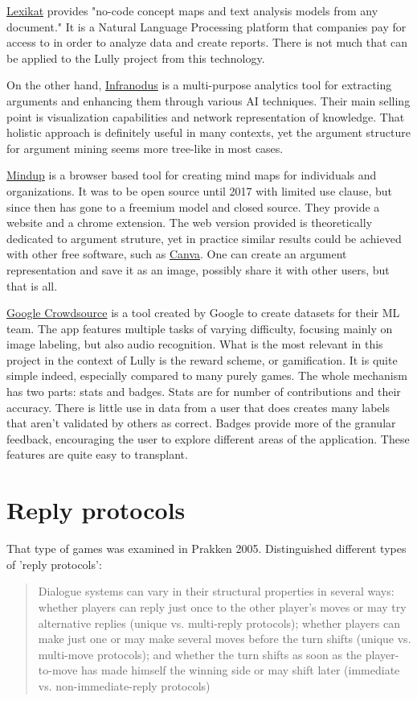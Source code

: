 \documentclass{article}
\begin{document}
\href{https://lexikat.com/#/}{Lexikat} provides "no-code concept maps and text analysis models from any document." It is a Natural Language Processing platform that companies pay for access to in order to analyze data and create reports. There is not much that can be applied to the Lully project from this technology.

On the other hand, \href{https://infranodus.com/}{Infranodus} is a multi-purpose analytics tool for extracting arguments and enhancing them through various AI techniques. Their main selling point is visualization capabilities and network representation of knowledge. That holistic approach is definitely useful in many contexts, yet the argument structure for argument mining seems more tree-like in most cases.

\href{https://www.mindmup.com/}{Mindup} is a browser based tool for creating mind maps for individuals and organizations. It was to be open source until 2017 with limited use clause, but since then has gone to a freemium model and closed source. They provide a website and a chrome extension. The web version provided is theoretically dedicated to argument struture, yet in practice similar results could be achieved with other free software, such as \href{https://www.canva.com/}{Canva}. One can create an argument representation and save it as an image, possibly share it with other users, but that is all.

\href{https://en.wikipedia.org/wiki/Crowdsource_(app)}{Google Crowdsource} is a tool created by Google to create datasets for their ML team. The app features multiple tasks of varying difficulty, focusing mainly on image labeling, but also audio recognition. What is the most relevant in this project in the context of Lully is the reward scheme, or gamification. It is quite simple indeed, especially compared to many purely games. The whole mechanism has two parts: stats and badges. Stats are for number of contributions and their accuracy. There is little use in data from a user that does creates many labels that aren't validated by others as correct. Badges provide more of the granular feedback, encouraging the user to explore different areas of the application. These features are quite easy to transplant.

\section{Reply protocols}
That type of games was examined in Prakken 2005. Distinguished different types of 'reply protocols':
\begin{quotation}
  Dialogue systems can vary in their structural properties
in several ways: whether players can reply just once to the other player’s moves or may try
alternative replies (unique vs. multi-reply protocols); whether players can make just one or may
make several moves before the turn shifts (unique vs. multi-move protocols); and whether the turn
shifts as soon as the player-to-move has made himself the winning side or may shift later (immediate
vs. non-immediate-reply protocols)
\end{quotation}
\cite[page 1010]{Prakken2005}
\end{document}

